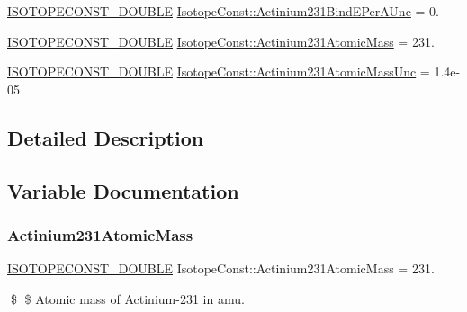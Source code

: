 \begin{DoxyCompactItemize}
\mbox{\hyperlink{group___isotope_const-_macros_ga8f45a7272ce02c0b4c65c44636ed719a}{I\+S\+O\+T\+O\+P\+E\+C\+O\+N\+S\+T\+\_\+\+D\+O\+U\+B\+LE}} \mbox{\hyperlink{group___isotope_const-_actinium-_ac231_gae1be4bd29581ac3f9dc857e1a3a7aa49}{Isotope\+Const\+::\+Actinium231\+Bind\+E\+Per\+A\+Unc}} = 0.
\item 
\mbox{\hyperlink{group___isotope_const-_macros_ga8f45a7272ce02c0b4c65c44636ed719a}{I\+S\+O\+T\+O\+P\+E\+C\+O\+N\+S\+T\+\_\+\+D\+O\+U\+B\+LE}} \mbox{\hyperlink{group___isotope_const-_actinium-_ac231_gada9e744a97b1e1ffef9fc20257dac569}{Isotope\+Const\+::\+Actinium231\+Atomic\+Mass}} = 231.
\item 
\mbox{\hyperlink{group___isotope_const-_macros_ga8f45a7272ce02c0b4c65c44636ed719a}{I\+S\+O\+T\+O\+P\+E\+C\+O\+N\+S\+T\+\_\+\+D\+O\+U\+B\+LE}} \mbox{\hyperlink{group___isotope_const-_actinium-_ac231_ga7c1bd01b9c7f8590787d0c1d55cde0a3}{Isotope\+Const\+::\+Actinium231\+Atomic\+Mass\+Unc}} = 1.\+4e-\/05
\end{DoxyCompactItemize}


\subsection{Detailed Description}


\subsection{Variable Documentation}
\mbox{\label{group___isotope_const-_actinium-_ac231_gada9e744a97b1e1ffef9fc20257dac569}} 
\subsubsection{\texorpdfstring{Actinium231\+Atomic\+Mass}{Actinium231AtomicMass}}
{\footnotesize\ttfamily \mbox{\hyperlink{group___isotope_const-_macros_ga8f45a7272ce02c0b4c65c44636ed719a}{I\+S\+O\+T\+O\+P\+E\+C\+O\+N\+S\+T\+\_\+\+D\+O\+U\+B\+LE}} Isotope\+Const\+::\+Actinium231\+Atomic\+Mass = 231.}

\$ \$ Atomic mass of Actinium-\/231 in amu. \mbox{\label{group___isotope_const-_actinium-_ac231_ga7c1bd01b9c7f8590787d0c1d55cde0a3}} 
